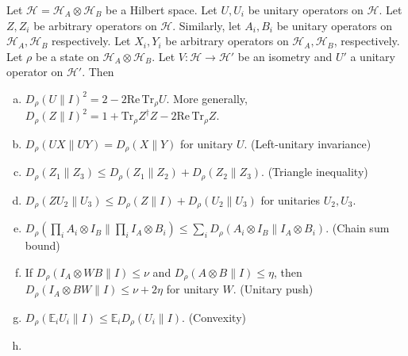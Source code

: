 \begin{lemma}\label{lemma:state-dependent-distance}
	Let $\mathcal{H} = \mathcal{H}_A\otimes \mathcal{H}_B$ be a Hilbert space. Let $U,U_i$ be unitary operators on $\mathcal{H}$. Let $Z,Z_i$ be arbitrary operators on $\mathcal{H}$. Similarly, let $A_i, B_i$ be unitary operators on $\mathcal{H}_A, \mathcal{H}_B$ respectively. Let $X_i, Y_i$ be arbitrary operators on $\mathcal{H}_A, \mathcal{H}_B$, respectively.
	Let $\rho$ be a state on $\mathcal{H}_A\otimes \mathcal{H}_B$. Let $V: \mathcal{H}\to \mathcal{H}'$ be an isometry and $U'$ a unitary operator on $\mathcal{H}'$. Then
	\begin{enumerate}[(a)]
		\item\label{item:state-dependent-distance-square}
		$D_\rho(U \| I)^2 =2 - 2\mathrm{Re}\,\mathrm{Tr}_\rho U$. More generally, $D_\rho(Z \| I)^2 = 1 + \mathrm{Tr}_\rho Z^\dagger Z - 2\mathrm{Re}\,\mathrm{Tr}_\rho Z$.
		\item\label{item:state-dependent-distance-inverse}
		$D_\rho(UX \| UY) = D_\rho(X \| Y)$ for unitary $U$. (Left-unitary invariance)
		\item\label{item:state-dependent-distance-triangle}
		$D_\rho(Z_1 \| Z_3) \leq D_\rho(Z_1 \| Z_2) + D_\rho(Z_2 \| Z_3)$. (Triangle inequality)
		\item\label{item:state-dependent-distance-right-multiplication}
		$D_\rho(ZU_2 \| U_3) \leq D_\rho(Z \| I) + D_\rho(U_2 \| U_3)$ for unitaries $U_2, U_3$.
		\item\label{item:state-dependent-distance-chaining}
		$D_\rho(\prod_{i}A_i\otimes I_B \| \prod_{i}I_A \otimes B_i) \leq \sum_i D_\rho(A_i\otimes I_B \| I_A\otimes B_i)$. (Chain sum bound)
		\item\label{item:state-dependent-distance-conjugation}
		If $D_\rho(I_A\otimes WB \| I) \leq \nu$ and $D_\rho(A\otimes B \| I)\leq \eta$, then $D_\rho(I_A\otimes BW \| I)\leq \nu + 2\eta$ for unitary $W$. (Unitary push)
		\item\label{item:state-dependent-distance-jensen}
		$D_\rho(\mathbb{E}_i U_i \| I) \leq \mathbb{E}_i D_\rho(U_i \| I)$. (Convexity)
		\item\label{item:state-dependent-distance-partial-trace}

\end{enumerate}
\end{lemma}
